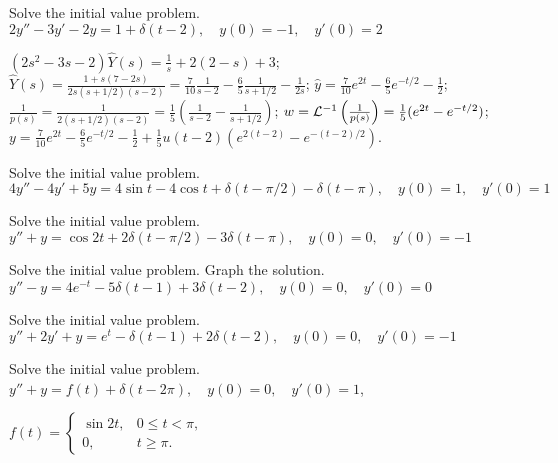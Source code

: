\documentclass{ximera}
\begin{document}
\begin{problem}\label{exer:8.7.14}
Solve the initial value
problem.
$2y''-3y'-2y=1+\delta(t-2), \quad  y(0)=-1,\quad y'(0)=2$

\begin{solution}
$(2s^2-3s-2)\hat Y(s)=\frac{1}{s}+2(2-s)+3$;
$\hat Y(s)=\frac{1+s(7-2s)}{2s(s+1/2)(s-2)}=\frac{7}{10}\frac{1}{s-2}-\frac{6}{5}\frac{1}{s+1/2}-\frac{1}{2s}$;
$\hat y=\frac{7}{10}e^{2t}-\frac{6}{5}e^{-t/2}-\frac{1}{2}$;
$\frac{1}{p(s)}=\frac{1}{2(s+1/2)(s-2)}=\frac{1}{5}\left(\frac{1}{s-2}-\frac{1}{s+1/2}\right)$;
$w={\cal L}^{-1}\left(\frac{1}{p(s)}\right)=\frac{1}{5}(e^{2t}-e^{-t/2})$;
$y=\frac{7}{10}e^{2t}-\frac{6}{5}e^{-t/2}-\frac{1}{2}+\frac{1}{5}u(t-2)
\left(e^{2(t-2)}-e^{-(t-2)/2}\right)$.
\end{solution}
\end{problem}

\begin{problem}\label{exer:8.7.15}
Solve the initial value
problem.
$4y''-4y'+5y=4\sin t-4\cos
t+\delta(t-\pi/2)-\delta(t-\pi), \quad  y(0)=1,\quad y'(0)=1$
\end{problem}

\begin{problem}\label{exer:8.7.16}
Solve the initial value
problem.
$y''+y=\cos2t+2\delta(t-\pi/2)-3\delta(t-\pi), \quad  y(0)=0,\quad y'(0)=-1$
\end{problem}

\begin{problem}\label{exer:8.7.17} Solve the initial value problem.  Graph the solution.
$y''-y=4e^{-t}-5\delta(t-1)+3\delta(t-2), \quad  y(0)=0,\quad y'(0)=0$
\end{problem}

\begin{problem}\label{exer:8.7.18}
Solve the initial value
problem.
$y''+2y'+y=e^t-\delta(t-1)+2\delta(t-2), \quad  y(0)=0,\quad y'(0)=-1$
\end{problem}

\begin{problem}\label{exer:8.7.19}
Solve the initial value
problem.
$y''+y=f(t)+\delta(t-2\pi), \quad  y(0)=0,\quad y'(0)=1$, 

$f(t)=\left\{\begin{array}{cl}
\sin2t,&0\le t<\pi,\\0,&t\ge \pi.\end{array}\right.$
\end{problem}
\end{document}
